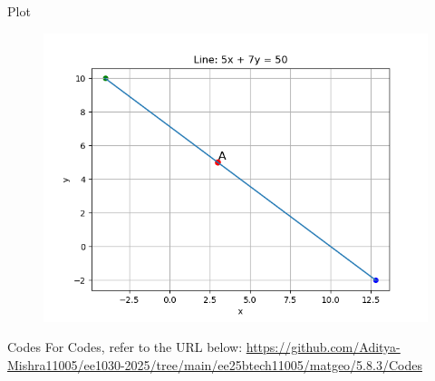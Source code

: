 \documentclass{beamer}
\begin{document}
\begin{frame}{Plot}
\begin{figure}
    \centering
    \includegraphics[width=0.8\columnwidth]{Figs/Figure_1.png}
\end{figure}
\end{frame}

\begin{frame}{Codes}
\centering
For Codes, refer to the URL below:  
\url{https://github.com/Aditya-Mishra11005/ee1030-2025/tree/main/ee25btech11005/matgeo/5.8.3/Codes}
\end{frame}
\end{document}

